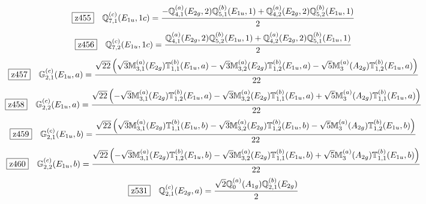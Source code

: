\documentclass[fleqn,10pt,landscape]{jsarticle}
\begin{document}
\begin{dmath*}
\hspace*{3mm}\fbox{z455}\quad \mathbb{Q}_{7,1}^{(c)}(E_{1u},1c)=\frac{- \mathbb{Q}_{4,1}^{(a)}(E_{2g},2) \mathbb{Q}_{5,1}^{(b)}(E_{1u},1) + \mathbb{Q}_{4,2}^{(a)}(E_{2g},2) \mathbb{Q}_{5,2}^{(b)}(E_{1u},1)}{2}
\end{dmath*}
\begin{dmath*}
\hspace*{3mm}\fbox{z456}\quad \mathbb{Q}_{7,2}^{(c)}(E_{1u},1c)=\frac{\mathbb{Q}_{4,1}^{(a)}(E_{2g},2) \mathbb{Q}_{5,2}^{(b)}(E_{1u},1) + \mathbb{Q}_{4,2}^{(a)}(E_{2g},2) \mathbb{Q}_{5,1}^{(b)}(E_{1u},1)}{2}
\end{dmath*}
\begin{dmath*}
\hspace*{3mm}\fbox{z457}\quad \mathbb{G}_{2,1}^{(c)}(E_{1u},a)=\frac{\sqrt{22} \left(\sqrt{3} \mathbb{M}_{3,1}^{(a)}(E_{2g}) \mathbb{T}_{1,1}^{(b)}(E_{1u},a) - \sqrt{3} \mathbb{M}_{3,2}^{(a)}(E_{2g}) \mathbb{T}_{1,2}^{(b)}(E_{1u},a) - \sqrt{5} \mathbb{M}_{3}^{(a)}(A_{2g}) \mathbb{T}_{1,2}^{(b)}(E_{1u},a)\right)}{22}
\end{dmath*}
\begin{dmath*}
\hspace*{3mm}\fbox{z458}\quad \mathbb{G}_{2,2}^{(c)}(E_{1u},a)=\frac{\sqrt{22} \left(- \sqrt{3} \mathbb{M}_{3,1}^{(a)}(E_{2g}) \mathbb{T}_{1,2}^{(b)}(E_{1u},a) - \sqrt{3} \mathbb{M}_{3,2}^{(a)}(E_{2g}) \mathbb{T}_{1,1}^{(b)}(E_{1u},a) + \sqrt{5} \mathbb{M}_{3}^{(a)}(A_{2g}) \mathbb{T}_{1,1}^{(b)}(E_{1u},a)\right)}{22}
\end{dmath*}
\begin{dmath*}
\hspace*{3mm}\fbox{z459}\quad \mathbb{G}_{2,1}^{(c)}(E_{1u},b)=\frac{\sqrt{22} \left(\sqrt{3} \mathbb{M}_{3,1}^{(a)}(E_{2g}) \mathbb{T}_{1,1}^{(b)}(E_{1u},b) - \sqrt{3} \mathbb{M}_{3,2}^{(a)}(E_{2g}) \mathbb{T}_{1,2}^{(b)}(E_{1u},b) - \sqrt{5} \mathbb{M}_{3}^{(a)}(A_{2g}) \mathbb{T}_{1,2}^{(b)}(E_{1u},b)\right)}{22}
\end{dmath*}
\begin{dmath*}
\hspace*{3mm}\fbox{z460}\quad \mathbb{G}_{2,2}^{(c)}(E_{1u},b)=\frac{\sqrt{22} \left(- \sqrt{3} \mathbb{M}_{3,1}^{(a)}(E_{2g}) \mathbb{T}_{1,2}^{(b)}(E_{1u},b) - \sqrt{3} \mathbb{M}_{3,2}^{(a)}(E_{2g}) \mathbb{T}_{1,1}^{(b)}(E_{1u},b) + \sqrt{5} \mathbb{M}_{3}^{(a)}(A_{2g}) \mathbb{T}_{1,1}^{(b)}(E_{1u},b)\right)}{22}
\end{dmath*}
\begin{dmath*}
\hspace*{3mm}\fbox{z531}\quad \mathbb{Q}_{2,1}^{(c)}(E_{2g},a)=\frac{\sqrt{2} \mathbb{Q}_{0}^{(a)}(A_{1g}) \mathbb{Q}_{2,1}^{(b)}(E_{2g})}{2}
\end{dmath*}
\end{document}
